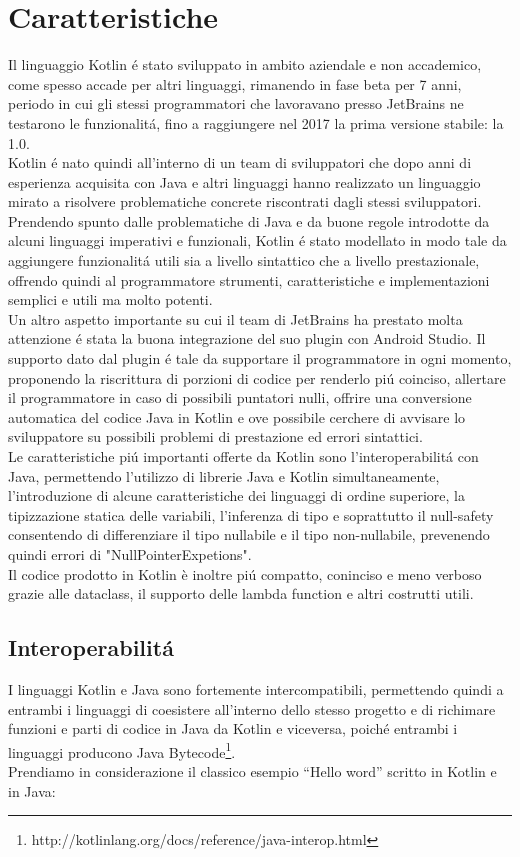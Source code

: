 \section{Caratteristiche}
Il linguaggio Kotlin \'e stato sviluppato in ambito aziendale e non accademico, come spesso accade per altri linguaggi, rimanendo in fase beta  per 7 anni, periodo in cui gli stessi programmatori che lavoravano presso JetBrains ne testarono le funzionalit\'a, fino a raggiungere nel 2017 la prima versione stabile: la 1.0. \\
Kotlin \'e nato quindi all'interno di un team di sviluppatori che dopo anni di esperienza acquisita con Java e altri linguaggi hanno realizzato un linguaggio mirato a risolvere problematiche concrete riscontrati dagli stessi sviluppatori.\\
Prendendo spunto dalle problematiche di Java e da buone regole introdotte da alcuni linguaggi imperativi e funzionali, Kotlin \'e stato modellato in modo tale da aggiungere funzionalit\'a utili sia a livello sintattico che a livello prestazionale, offrendo quindi al programmatore strumenti, caratteristiche e implementazioni semplici e utili ma molto potenti.\\
Un altro aspetto importante su cui il team di JetBrains ha prestato molta attenzione \'e stata la buona integrazione del suo plugin con Android Studio. Il supporto dato dal plugin \'e tale da supportare il programmatore in ogni momento, proponendo la riscrittura di porzioni di codice per renderlo pi\'u coinciso, allertare il programmatore in caso di possibili puntatori nulli, offrire una conversione automatica del codice Java in Kotlin e ove possibile cerchere di avvisare lo sviluppatore su possibili problemi di prestazione ed errori sintattici.\\
Le caratteristiche pi\'u importanti offerte da Kotlin sono l'interoperabilit\'a con Java, permettendo l'utilizzo di librerie Java e Kotlin simultaneamente, l'introduzione di alcune caratteristiche dei linguaggi di ordine superiore, la tipizzazione statica delle variabili, l'inferenza di tipo e soprattutto il null-safety consentendo di differenziare il tipo nullabile e il tipo non-nullabile, prevenendo quindi errori di "NullPointerExpetions".\\
Il codice prodotto in Kotlin \`e inoltre pi\'u compatto, coninciso e meno verboso grazie alle dataclass, il supporto delle lambda function e altri costrutti utili.


\subsection{Interoperabilit\'a}
I linguaggi Kotlin e Java sono fortemente intercompatibili, permettendo quindi a entrambi i linguaggi di coesistere all'interno dello stesso progetto e di richimare funzioni e parti di codice in Java da Kotlin e viceversa, poich\'e entrambi i linguaggi producono Java Bytecode\footnote{http://kotlinlang.org/docs/reference/java-interop.html}.\\
Prendiamo in considerazione il classico esempio ``Hello word'' scritto in Kotlin e in Java:

